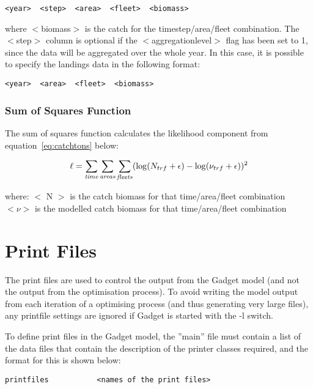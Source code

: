 \documentclass[10pt,twoside]{book}
\begin{document}
{\small\begin{verbatim}
<year>  <step>  <area>  <fleet>  <biomass>
\end{verbatim}}

where $<$biomass$>$ is the catch for the timestep/area/fleet combination.  The $<$step$>$ column is optional if the $<$aggregationlevel$>$ flag has been set to 1, since the data will be aggregated over the whole year.  In this case, it is possible to specify the landings data in the following format:

{\small\begin{verbatim}
<year>  <area>  <fleet>  <biomass>
\end{verbatim}}

\subsection{Sum of Squares Function}
The sum of squares function calculates the likelihood component from equation~\ref{eq:catchtons} below:

\begin{equation}\label{eq:catchtons}
\ell = \sum_{\it time}\sum_{\it areas}\sum_{\it fleets} (\log(N_{trf} + \epsilon) - \log(\nu_{trf} + \epsilon))^2
\end{equation}

where:\newline
$<$ N $>$ is the catch biomass for that time/area/fleet combination\newline
$<\nu>$ is the modelled catch biomass for that time/area/fleet combination

\chapter{Print Files}\label{chap:print}
The print files are used to control the output from the Gadget model (and not the output from the optimisation process).  To avoid writing the model output from each iteration of a optimising process (and thus generating very large files), any printfile settings are ignored if Gadget is started with the -l switch.

\bigskip
To define print files in the Gadget model, the ''main'' file must contain a list of the data files that contain the description of the printer classes required, and the format for this is shown below:

{\small\begin{verbatim}
printfiles           <names of the print files>
\end{verbatim}}
\end{document}
